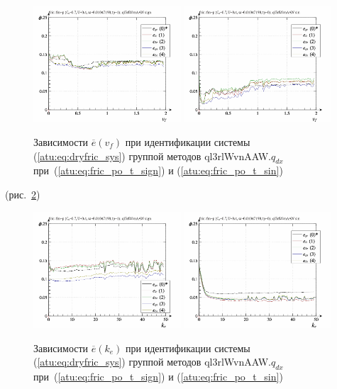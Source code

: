 \begin{figure}[htb!]
  \centerline{
    \includegraphics[width=0.49\textwidth]{p/cha/fric/ql3rlWvnAAW/fric_id-p_v_f_sign.png}
    \hfill
    \includegraphics[width=0.49\textwidth]{p/cha/fric/ql3rlWvnAAW/fric_id-p_v_f_sin.png}
  }
  \caption{Зависимости $\overline{e}(v_f)$ при идентификации системы (\ref{atu:eq:dryfric_sys}) группой методов ql3rlWvnAAW.$q_{dx}$
   при~(\ref{atu:eq:fric_po_t_sign}) и (\ref{atu:eq:fric_po_t_sin})}
  \label{atu:f:fric_v_f_ql3rlWvnAAW_q_dx}
\end{figure}

(рис.~\ref{atu:f:fric_k_e_ql3rlWvnAAW_q_dx})

\begin{figure}[htb!]
  \centerline{
    \includegraphics[width=0.49\textwidth]{p/cha/fric/ql3rlWvnAAW/fric_id-p_k_e_sign.png}
    \hfill
    \includegraphics[width=0.49\textwidth]{p/cha/fric/ql3rlWvnAAW/fric_id-p_k_e_sin.png}
  }
  \caption{Зависимости $\overline{e}(k_e)$ при идентификации системы (\ref{atu:eq:dryfric_sys}) группой методов ql3rlWvnAAW.$q_{dx}$
   при~(\ref{atu:eq:fric_po_t_sign}) и (\ref{atu:eq:fric_po_t_sin})}
  \label{atu:f:fric_k_e_ql3rlWvnAAW_q_dx}
\end{figure}

